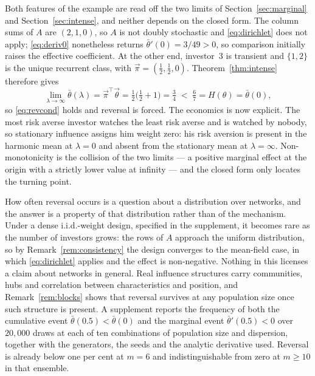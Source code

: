 \documentclass[12pt]{article}
\theoremstyle{definition}
\theoremstyle{remark}
\newcommand{\bth}{\bar\theta}
\begin{document}
Both features of the example are read off the two limits of
Section~\ref{sec:marginal} and Section~\ref{sec:intense}, and neither depends on
the closed form. The column sums of $A$ are $(2,1,0)$, so $A$ is not doubly
stochastic and \eqref{eq:dirichlet} does not apply; \eqref{eq:deriv0}
nonetheless returns $\bth'(0)=3/49>0$, so comparison initially raises the
effective coefficient. At the other end, investor~3 is transient and
$\{1,2\}$ is the unique recurrent class, with $\vec\pi=(\tfrac12,\tfrac12,0)$.
Theorem~\ref{thm:intense} therefore gives
%
\begin{equation*}
\lim_{\lambda\to\infty}\bth(\lambda)
=\vec\pi^{\top}\vec\theta=\tfrac12\big(\tfrac12+1\big)=\tfrac34
\;<\;\tfrac67=H(\theta)=\bth(0),
\end{equation*}
%
so \eqref{eq:revcond} holds and reversal is forced. The economics is now
explicit. The most risk averse investor watches the least risk averse and is
watched by nobody, so stationary influence assigns him weight zero: his risk
aversion is present in the harmonic mean at $\lambda=0$ and absent from the
stationary mean at $\lambda=\infty$. Non-monotonicity is the collision of the
two limits --- a positive marginal effect at the origin with a strictly lower
value at infinity --- and the closed form only locates the turning point.

How often reversal occurs is a question about a distribution over networks, and
the answer is a property of that distribution rather than of the mechanism.
Under a dense i.i.d.-weight design, specified in the supplement, it becomes rare
as the number of investors grows: the rows of $A$ approach the uniform
distribution, so
by Remark~\ref{rem:consistency} the design converges to the mean-field case, in
which \eqref{eq:dirichlet} applies and the effect is non-negative. Nothing in
this licenses a claim about networks in general. Real influence structures carry
communities, hubs and correlation between characteristics and position, and
Remark~\ref{rem:blocks} shows that reversal survives at any population size once
such structure is present.
A supplement reports the frequency of both the cumulative event
$\bth(0.5)<\bth(0)$ and the marginal event $\bth'(0.5)<0$ over $20{,}000$ draws
at each of ten combinations of population size and dispersion, together with the
generators, the seeds and the analytic derivative used. Reversal is already
below one per cent at $m=6$ and indistinguishable from zero at $m\geq10$ in that
ensemble.
\end{document}
